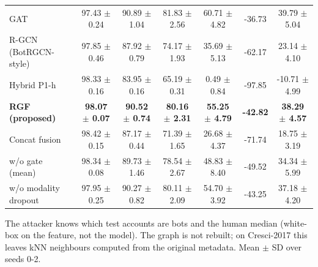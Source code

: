\begin{table}[!t]
\begin{tabular}{lcccccc}
GAT & 97.43 $\pm$ 0.24 & 90.89 $\pm$ 1.04 & 81.83 $\pm$ 2.56 & 60.71 $\pm$ 4.82 & -36.73 & 39.79 $\pm$ 5.04 \\
R-GCN (BotRGCN-style) & 97.85 $\pm$ 0.46 & 87.92 $\pm$ 0.79 & 74.17 $\pm$ 1.93 & 35.69 $\pm$ 5.13 & -62.17 & 23.14 $\pm$ 4.10 \\
Hybrid P1-h & 98.33 $\pm$ 0.16 & 83.95 $\pm$ 0.16 & 65.19 $\pm$ 0.31 & 0.49 $\pm$ 0.84 & -97.85 & -10.71 $\pm$ 4.99 \\
\textbf{RGF (proposed)} & \textbf{98.07 $\pm$ 0.07} & \textbf{90.52 $\pm$ 0.74} & \textbf{80.16 $\pm$ 2.31} & \textbf{55.25 $\pm$ 4.79} & \textbf{-42.82} & \textbf{38.29 $\pm$ 4.57} \\
Concat fusion & 98.42 $\pm$ 0.15 & 87.17 $\pm$ 0.44 & 71.39 $\pm$ 1.65 & 26.68 $\pm$ 4.37 & -71.74 & 18.75 $\pm$ 3.19 \\
w/o gate (mean) & 98.34 $\pm$ 0.08 & 89.73 $\pm$ 1.46 & 78.54 $\pm$ 2.67 & 48.83 $\pm$ 8.40 & -49.52 & 34.34 $\pm$ 5.99 \\
w/o modality dropout & 97.95 $\pm$ 0.25 & 90.27 $\pm$ 0.82 & 80.11 $\pm$ 2.09 & 54.70 $\pm$ 3.92 & -43.25 & 37.18 $\pm$ 4.20 \\
\hline
\end{tabular}
\par\smallskip\parbox{\linewidth}{\scriptsize The attacker knows which test accounts are bots and the human median (white-box on the feature, not the model). The graph is not rebuilt; on Cresci-2017 this leaves kNN neighbours computed from the original metadata. Mean $\pm$ SD over seeds 0-2.}
\end{table}